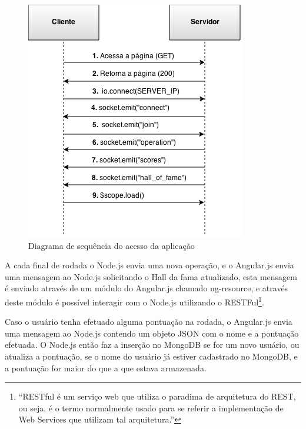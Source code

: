 \begin{description}
    \begin{figure}[htb]
    \centering
    \includegraphics[scale=0.7]{images/diagrama_de_seq_acesso.png}
    \caption{Diagrama de sequência do acesso da aplicação}
    \label{fig: Diagrama de sequência do acesso da aplicação}
    \end{figure}

A cada final de rodada o Node.js envia uma nova operação, e o Angular.js envia uma mensagem ao Node.js solicitando o Hall da fama atualizado, esta mensagem é enviado através de um módulo do Angular.js chamado ng-resource, e através deste módulo é possível interagir com o Node.js utilizando o RESTFul\footnote{ ``RESTful é um serviço web que utiliza o paradima de arquitetura do REST, ou seja, é o termo normalmente usado para se referir a implementação de Web Services que utilizam tal arquitetura.''\cite{RESTWiki}}. 

Caso o usuário tenha efetuado alguma pontuação na rodada, o Angular.js envia uma mensagem ao  Node.js contendo um objeto JSON com o nome e a pontuação efetuada. O Node.js então faz a inserção no MongoDB se for um novo usuário, ou atualiza a pontuação, se o nome do usuário já estiver cadastrado no MongoDB, e a pontuação for maior do que a que estava armazenada.

\end{description}


